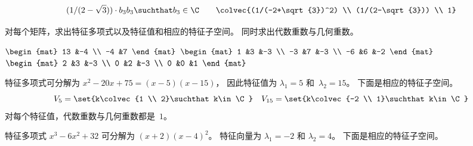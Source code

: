 \begin{exercises}
\begin{answer}
\begin{exparts}
\begin{equation*}
{{                           (1/(2-\sqrt{3}))\cdot b_3    \\ 
                           b_3}
                    \suchthat b_3\in\C}
             \qquad
             \colvec{(1/(-2+\sqrt{3})^2)  \\ 
                           (1/(2-\sqrt{3}))  \\ 
                           1}
           \end{equation*}
       \end{exparts}
     \end{answer}
  \item 
   对每个矩阵，求出特征多项式以及特征值和相应的特征子空间。
   同时求出代数重数与几何重数。
    \begin{exparts*}
      \partsitem 
        $\begin{mat}
           13 &-4 \\
           -4 &7
         \end{mat}$
      \partsitem
         $\begin{mat}
           1 &3 &-3 \\
          -3 &7 &-3 \\
          -6 &6 &-2
         \end{mat}$
     \partsitem
         $\begin{mat}
           2 &3 &-3 \\
           0 &2 &-3 \\
           0 &0 &1
         \end{mat}$
    \end{exparts*}
    \begin{answer}
      \begin{exparts}
        \item 特征多项式可分解为 
          $x^2-20x+75=(x-5)(x-15)$，
          因此特征值为 $\lambda_1=5$ 和~$\lambda_2=15$。
          下面是相应的特征子空间。
          \begin{equation*}
            V_5=\set{k\colvec{1 \\ 2}\suchthat k\in\C}
            \quad
            V_{15}=\set{k\colvec{-2 \\ 1}\suchthat k\in\C}
          \end{equation*}
          对每个特征值，代数重数与几何重数都是~$1$。
       \item 特征多项式 $x^3 - 6x^2 + 32$ 可分解为
          $(x+2)(x-4)^2$。
          特征向量为 $\lambda_1=-2$ 和 $\lambda_2=4$。
          下面是相应的特征子空间。
          \begin{equation*}

\end{equation*}
\end{exparts}
\end{answer}
\end{exercises}
